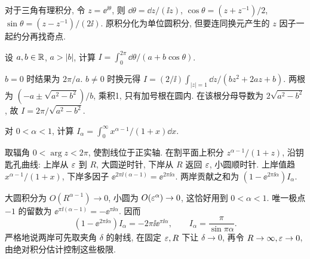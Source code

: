 对于三角有理积分, 令 $z=\ee^{\ii\theta}$, 则 $\dd\theta=\dd z/(\ii z)$, $\cos\theta=(z+z^{-1})/2$, $\sin\theta=(z-z^{-1})/(2\ii)$. 原积分化为单位圆积分, 但要连同换元产生的 $z$ 因子一起约分再找奇点.
\begin{example}
设 $a,b\in\mathbb R$, $a>|b|$, 计算 $I=\int_0^{2\pi}\dd\theta/(a+b\cos\theta)$.
\end{example}
\begin{solution}
$b=0$ 时结果为 $2\pi/a$. $b\ne0$ 时换元得 $I=(2/\ii)\int_{|z|=1}\dd z/(bz^2+2az+b)$. 两根为 $(-a\pm\sqrt{a^2-b^2})/b$, 乘积1, 只有加号根在圆内. 在该根分母导数为 $2\sqrt{a^2-b^2}$, 故 $I=2\pi/\sqrt{a^2-b^2}$.
\end{solution}

\begin{example}\label{ex:keyhole}
对 $0<\alpha<1$, 计算 $I_\alpha=\int_0^\infty x^{\alpha-1}/(1+x)\dd x$.
\end{example}
\begin{solution}
取辐角 $0<\arg z<2\pi$, 使割线位于正实轴. 在割平面上积分 $z^{\alpha-1}/(1+z)$, 沿钥匙孔曲线: 上岸从 $\varepsilon$ 到 $R$, 大圆逆时针, 下岸从 $R$ 返回 $\varepsilon$, 小圆顺时针. 上岸值趋 $x^{\alpha-1}/(1+x)$, 下岸多因子 $\ee^{2\pi\ii(\alpha-1)}=\ee^{2\pi\ii\alpha}$. 两岸贡献之和为 $(1-\ee^{2\pi\ii\alpha})I_\alpha$.

大圆积分为 $O(R^{\alpha-1})\to0$, 小圆为 $O(\varepsilon^\alpha)\to0$, 这恰好用到 $0<\alpha<1$. 唯一极点 $-1$ 的留数为 $\ee^{\pi\ii(\alpha-1)}=-\ee^{\pi\ii\alpha}$. 因而
\[
(1-\ee^{2\pi\ii\alpha})I_\alpha=-2\pi\ii\ee^{\pi\ii\alpha},\qquad
I_\alpha=\frac\pi{\sin\pi\alpha}.
\]
严格地说两岸可先取夹角 $\delta$ 的射线, 在固定 $\varepsilon,R$ 下让 $\delta\to0$, 再令 $R\to\infty,\varepsilon\to0$, 由绝对积分估计控制这些极限.
\end{solution}
\begin{center}
\end{center}

